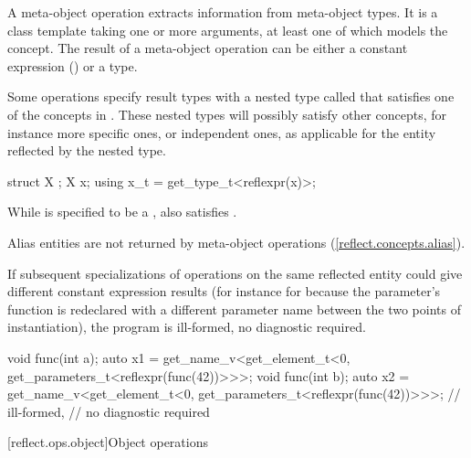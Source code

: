 \begin{std.txt}\color{addclr}
\pnum
A meta-object operation extracts information from meta-object types. It is a class template taking one or more arguments, at least one of which models the  concept. The result of a meta-object operation can be either a constant expression () or a type.

\pnum
Some operations specify result types with a nested type called  that satisfies one of the concepts in .
These nested types will possibly satisfy other concepts, for instance more specific ones, or independent ones, as applicable for the entity reflected by the nested type.
\begin{example}\begin{codeblock}
struct X {};
X x;
using x_t = get_type_t<reflexpr(x)>;\end{codeblock}
While  is specified to be a ,  also satisfies . \end{example}
Alias entities are not returned by meta-object operations (\ref{reflect.concepts.alias}).

\pnum
If subsequent specializations of operations on the same reflected entity could give different constant expression results (for instance for  because the parameter's function is redeclared with a different parameter name between the two points of instantiation), the program is ill-formed, no diagnostic required.
   \begin{example}\begin{codeblock}
void func(int a);
auto x1 = get_name_v<get_element_t<0, get_parameters_t<reflexpr(func(42))>>>;
void func(int b);
auto x2 = get_name_v<get_element_t<0, get_parameters_t<reflexpr(func(42))>>>; // ill-formed,
                                                                    // no diagnostic required\end{codeblock}
\end{example}

\end{std.txt}

[reflect.ops.object]{Object operations}

